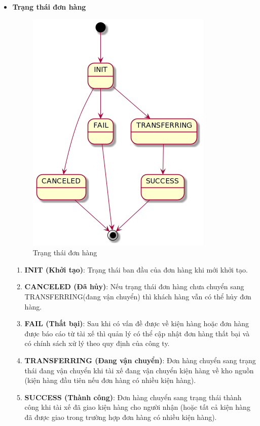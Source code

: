     \begin{itemize}
    	\item \textbf{Trạng thái đơn hàng}
    	
    	\begin{figure}[H]
    		\centering
    		\includegraphics[width=0.7\linewidth]{Images/orderstatus.png}
    		\linebreak
    		\caption{Trạng thái đơn hàng}
    	\end{figure}
    	
    	\begin{enumerate}
    		\item \textbf{INIT (Khởi tạo)}: Trạng thái ban đầu của đơn hàng khi mới khởi tạo.
    		\item \textbf{CANCELED (Đã hủy)}: Nếu trạng thái đơn hàng chưa chuyển sang TRANSFERRING(đang vận chuyển) thì khách hàng vẫn có thể hủy đơn hàng.
    		\item \textbf{FAIL (Thất bại)}: Sau khi có vấn đề được về kiện hàng hoặc đơn hàng được báo cáo từ tài xế thì quản lý có thể cập nhật đơn hàng thất bại và có chính sách xử lý theo quy định của công ty.
    		\item \textbf{TRANSFERRING (Đang vận chuyển)}: Đơn hàng chuyển sang trạng thái đang vận chuyển khi tài xế đang vận chuyển kiện hàng về kho nguồn (kiện hàng đầu tiên nếu đơn hàng có nhiều kiện hàng).
    		\item \textbf{SUCCESS (Thành công)}: Đơn hàng chuyển sang trạng thái thành công khi tài xế đã giao kiện hàng cho người nhận (hoặc tất cả kiện hàng đã được giao trong trường hợp đơn hàng có nhiều kiện hàng).
    	\end{enumerate}
    

\end{itemize}
